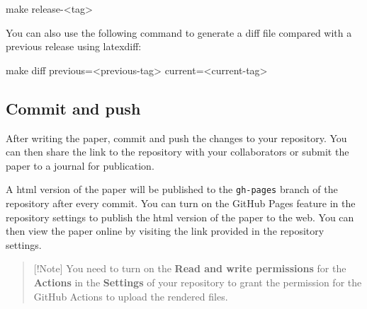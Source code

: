 \documentclass[
  authoryear,
  review,
  3p,
  onecolumn]{elsarticle}
\newenvironment{Shaded}{\begin{snugshade}}{\end{snugshade}}
\newcommand{\NormalTok}[1]{\textcolor[rgb]{0.00,0.23,0.31}{#1}}
\begin{document}
\begin{Shaded}
\begin{Highlighting}[]
\NormalTok{make release{-}\textless{}tag\textgreater{}}
\end{Highlighting}
\end{Shaded}

You can also use the following command to generate a diff file compared
with a previous release using latexdiff:

\begin{Shaded}
\begin{Highlighting}[]
\NormalTok{make diff previous=\textless{}previous{-}tag\textgreater{} current=\textless{}current{-}tag\textgreater{}}
\end{Highlighting}
\end{Shaded}

\subsection{Commit and push}\label{commit-and-push}

After writing the paper, commit and push the changes to your repository.
You can then share the link to the repository with your collaborators or
submit the paper to a journal for publication.

A html version of the paper will be published to the \texttt{gh-pages}
branch of the repository after every commit. You can turn on the GitHub
Pages feature in the repository settings to publish the html version of
the paper to the web. You can then view the paper online by visiting the
link provided in the repository settings.

\begin{quote}
{[}!Note{]} You need to turn on the \textbf{Read and write permissions}
for the \textbf{Actions} in the \textbf{Settings} of your repository to
grant the permission for the GitHub Actions to upload the rendered
files.
\end{quote}


  
\end{document}
